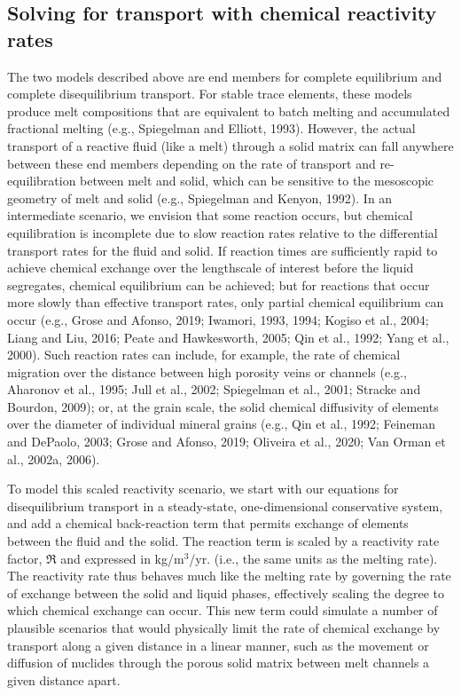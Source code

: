 \documentclass[draft]{agujournal2019}
\begin{document}
\subsection{Solving for transport with chemical reactivity rates}

The two models described above are end members for complete equilibrium and complete disequilibrium transport. For stable trace elements, these models produce melt compositions that are equivalent to batch melting and accumulated fractional melting (e.g., Spiegelman and Elliott, 1993). However, the actual transport of a reactive fluid (like a melt) through a solid matrix can fall anywhere between these end members depending on the rate of transport and re-equilibration between melt and solid, which can be sensitive to the mesoscopic geometry of melt and solid (e.g., Spiegelman and Kenyon, 1992). In an intermediate scenario, we envision that some reaction occurs, but chemical equilibration is incomplete due to slow reaction rates relative to the differential transport rates for the fluid and solid. If reaction times are sufficiently rapid to achieve chemical exchange over the lengthscale of interest before the liquid segregates, chemical equilibrium can be achieved; but for reactions that occur more slowly than effective transport rates, only partial chemical equilibrium can occur (e.g., Grose and Afonso, 2019; Iwamori, 1993, 1994; Kogiso et al., 2004; Liang and Liu, 2016; Peate and Hawkesworth, 2005; Qin et al., 1992; Yang et al., 2000). Such reaction rates can include, for example, the rate of chemical migration over the distance between high porosity veins or channels (e.g., Aharonov et al., 1995; Jull et al., 2002; Spiegelman et al., 2001; Stracke and Bourdon, 2009); or, at the grain scale, the solid chemical diffusivity of elements over the diameter of individual mineral grains (e.g., Qin et al., 1992; Feineman and DePaolo, 2003; Grose and Afonso, 2019; Oliveira et al., 2020; Van Orman et al., 2002a, 2006).

To model this scaled reactivity scenario, we start with our equations for disequilibrium transport in a steady-state, one-dimensional conservative system, and add a chemical back-reaction term that permits exchange of elements between the fluid and the solid. The reaction term is scaled by a reactivity rate factor, $\Re$ and expressed in kg/m$^3$/yr. (i.e., the same units as the melting rate). The reactivity rate thus behaves much like the melting rate by governing the rate of exchange between the solid and liquid phases, effectively scaling the degree to which chemical exchange can occur. This new term could simulate a number of plausible scenarios that would physically limit the rate of chemical exchange by transport along a given distance in a linear manner, such as the movement or diffusion of nuclides through the porous solid matrix between melt channels a given distance apart.
\end{document}

